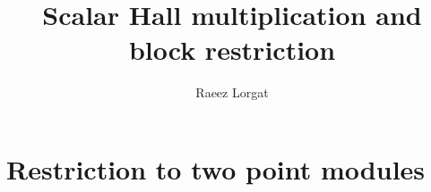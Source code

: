 \documentclass[11pt,oneside]{memoir}
\title{Scalar Hall multiplication and block restriction}
\author{Raeez Lorgat}
\date{}
\begin{document}
\mainmatter




\chapter{Restriction to two point modules}




\end{document}
